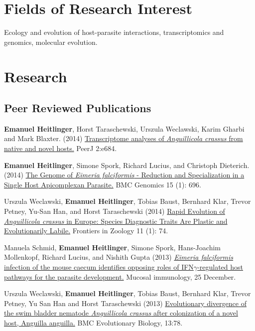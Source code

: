 \documentclass[10pt,a4paper]{article}
\renewenvironment{itemize}{
  \begin{list}{}{
    \setlength{\leftmargin}{2.5em}
    \setlength{\itemsep}{0.25em}
    \setlength{\parskip}{0pt}
    \setlength{\parsep}{0.25em}
  }
}{
  \end{list}
}
\begin{document}
\section*{Fields of Research Interest}
Ecology and evolution of host-parasite interactions, transcriptomics
and genomics, molecular evolution.

\section*{Research}

\subsection*{Peer Reviewed Publications}

\begin{itemize}


\item \textbf{Emanuel Heitlinger}, Horst Taraschewski, Urszula
  Weclawski, Karim Gharbi and Mark Blaxter. (2014)
  \href{https://peerj.com/articles/684/}{Transcriptome analyses of
    \textit{Anguillicola crassus} from native and novel hosts.}  PeerJ
  2:e684.

\item \textbf{Emanuel Heitlinger}, Simone Spork, Richard Lucius, and
  Christoph Dieterich. (2014)
  \href{http://www.biomedcentral.com/1471-2164/15/696/abstract}{The
    Genome of \textit{Eimeria falciformis} - Reduction and Specialization in a
    Single Host Apicomplexan Parasite.} BMC Genomics 15 (1): 696.

\item Urszula Weclawski, \textbf{Emanuel Heitlinger}, Tobias Baust,
  Bernhard Klar, Trevor Petney, Yu-San Han, and Horst Taraschewski
  (2014) \href{http://www.frontiersinzoology.com/content/11/1/74}{
    Rapid Evolution of \textit{Anguillicola crassus} in Europe: Species
    Diagnostic Traits Are Plastic and Evolutionarily Labile.}
  Frontiers in Zoology 11 (1): 74.

\item Manuela Schmid, \textbf{Emanuel Heitlinger}, Simone Spork, Hans-Joachim
  Mollenkopf, Richard Lucius, and Nishith Gupta (2013)
  \href{http://www.nature.com/mi/journal/vaop/ncurrent/full/mi2013115a.html}
  {\textit{Eimeria falciformis} infection of the mouse caecum identifies
    opposing roles of IFN$\gamma$-regulated host pathways for the parasite
    development.} Mucosal immunology, 25 December.

\item Urszula Weclawski, \textbf{Emanuel Heitlinger}, Tobias Baust,
  Bernhard Klar, Trevor Petney, Yu San Han and Horst Taraschewski
  (2013) 
  \href{http://www.biomedcentral.com/1471-2148/13/78}{
    Evolutionary divergence of the swim bladder nematode
    \textit{Anguillicola crassus} after colonization of a novel host,
    Anguilla anguilla.} BMC Evolutionary Biology,
  13:78.


\end{itemize}
\end{document}
